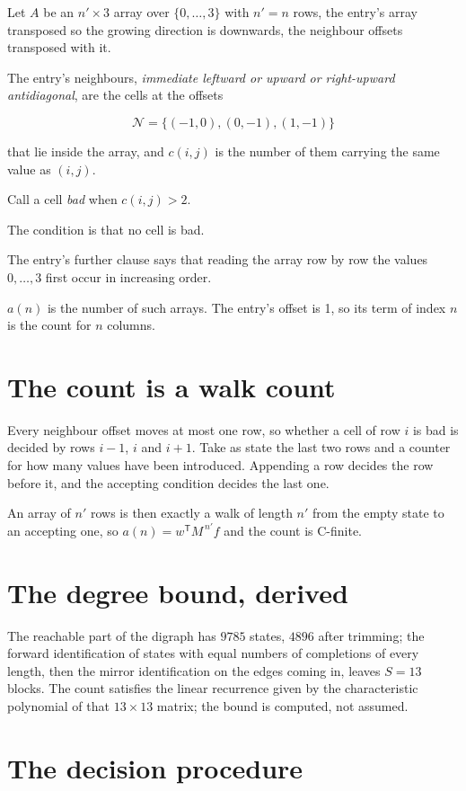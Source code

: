 \documentclass[11pt]{article}
\theoremstyle{definition}
\begin{document}
Let $A$ be an $n' \times 3$ array over $\{0,\dots,3\}$ with $n' = n$ rows, the entry's array transposed so the growing direction is downwards, the neighbour offsets transposed with it.

The entry's neighbours, {\itshape immediate leftward or upward or right-upward antidiagonal}, are the cells at the offsets

\[\mathcal{N} = \{(-1,0), (0,-1), (1,-1)\}\]

that lie inside the array, and $c(i,j)$ is the number of them carrying the same value as $(i,j)$.

Call a cell {\itshape bad} when $c(i,j) > 2$.

The condition is that no cell is bad.

The entry's further clause says that reading the array row by row the values $0,\dots,3$ first occur in increasing order.

$a(n)$ is the number of such arrays. The entry's offset is 1, so its term of index $n$ is the count for $n$ columns.

\section{The count is a walk count}

Every neighbour offset moves at most one row, so whether a cell of row $i$ is bad is decided by rows $i-1$, $i$ and $i+1$. Take as state the last two rows and a counter for how many values have been introduced. Appending a row decides the row before it, and the accepting condition decides the last one.

An array of $n'$ rows is then exactly a walk of length $n'$ from the empty state to an accepting one, so $a(n) = w^{\mathsf T}M^{\,n'}f$ and the count is C-finite.

\section{The degree bound, derived}

The reachable part of the digraph has $9785$ states, $4896$ after trimming; the forward identification of states with equal numbers of completions of every length, then the mirror identification on the edges coming in, leaves $S = 13$ blocks. The count satisfies the linear recurrence given by the characteristic polynomial of that $13\times13$ matrix; the bound is computed, not assumed.

\section{The decision procedure}
\end{document}
